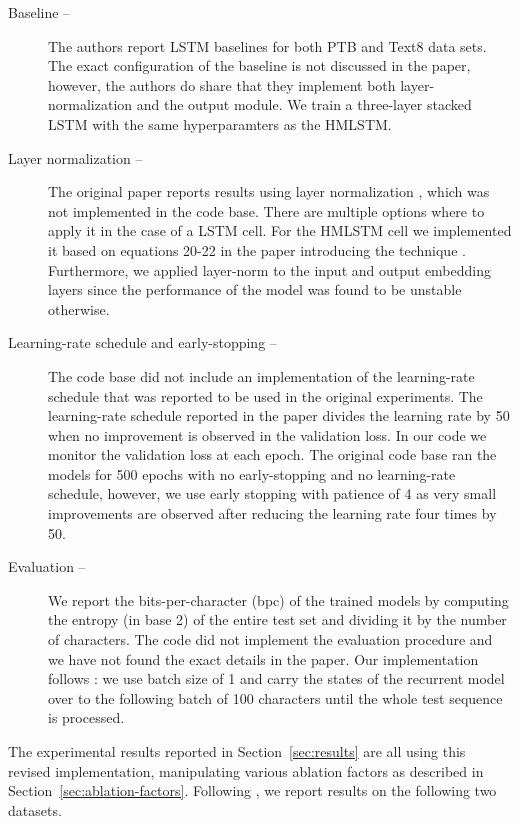 \begin{description}
\item[Baseline --] The authors report LSTM baselines for both PTB and Text8 data sets. The exact configuration of the baseline is not discussed in the paper, however, the authors do share that they implement both layer-normalization and the output module.
We train a three-layer stacked LSTM with the same hyperparamters as the HMLSTM.
\item[Layer normalization --] The original paper reports results using layer normalization \citep{ba2016layer}, which was not implemented in the code base. There are multiple options where to apply it in the case of a LSTM cell. For the HMLSTM cell we implemented it based on equations 20-22 in the paper introducing the technique \citep{ba2016layer}. Furthermore, we applied layer-norm to the input and output embedding layers since the performance of the model was found to be unstable otherwise. 
\item[Learning-rate schedule and early-stopping --] The code base did not include an implementation of the learning-rate schedule that was reported to be used in the original experiments. The learning-rate schedule reported in the paper divides the learning rate by 50 when no improvement is observed in the validation loss. In our code we monitor the validation loss at each epoch. The original code base ran the models for 500 epochs with no early-stopping and no learning-rate schedule, however, we use early stopping with patience of 4 as very small improvements are observed after reducing the learning rate four times by 50. 
\item[Evaluation --] 
We report the bits-per-character (bpc) of the trained models by computing the entropy (in base 2) of the entire test set and dividing it by the number of characters. The code did not implement the evaluation procedure and we have not found the exact details in the paper. Our implementation follows  \cite{mikolovsubword}: we use batch size of 1 and carry the states  of the recurrent model over to the following batch of 100 characters until the 
whole test sequence is processed.
\end{description}

\noindent The experimental results reported in Section~\ref{sec:results} are all using this revised 
implementation, manipulating various ablation factors as described in 
Section~\ref{sec:ablation-factors}. 
Following \cite{chung2016hierarchical}, we report results on the following two datasets. 

